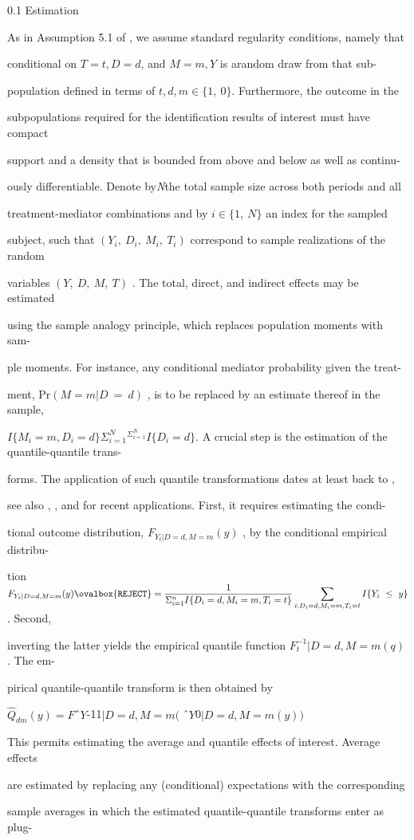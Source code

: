 \documentclass[a4paper,12pt]{article}
\begin{document}
0.1 Estimation

As in Assumption 5.1 of , we assume standard regularity conditions, namely that

conditional on $T = t, D = d$, and $M = m, Y$ is arandom draw from that sub-

population defined in terms of $t, d, m \in \{1,\ 0\}$. Furthermore, the outcome in the

subpopulations required for the identification results of interest must have compact

support and a density that is bounded from above and below as well as continu-

ously differentiable. Denote by{\it N}the total sample size across both periods and all

treatment-mediator combinations and by $i \in \{1,\ N\}$ an index for the sampled

subject, such that $(Y_{i},\ D_{i},\ M_{i},\ T_{i})$ correspond to sample realizations of the random

variables $(Y,\ D,\ M,\ T)$ . The total, direct, and indirect effects may be estimated

using the sample analogy principle, which replaces population moments with sam-

ple moments. For instance, any conditional mediator probability given the treat-

ment, $\mathrm{P}\mathrm{r} (M=m|D\ =\ d)$ , is to be replaced by an estimate thereof in the sample,

$I\{M_{i}=m,D_{i}=d\}\Sigma_{i=1}^{N}^{\Sigma_{i=1}^{N}}I\{D_{i}=d\}$. A crucial step is the estimation of the quantile-quantile trans-

forms. The application of such quantile transformations dates at least back to ,

see also , , and for recent applications. First, it requires estimating the condi-

tional outcome distribution, $F_{Y_{t}|D=d,M=m}(y)$ , by the conditional empirical distribu-

tion $F_{Y_{t}|D=d,M=m}(y)\ovalbox{\tt\small REJECT} = \displaystyle \frac{1}{\Sigma_{i=1}^{n}I\{D_{i}=d,M_{i}=m,T_{i}=t\}}\sum_{i:D_{i}=d,M_{i}=m,T_{i}=t}I\{Y_{i}\ \leq\ y\}$. Second,

inverting the latter yields the empirical quantile function $F_{t}^{-1}|D=d,M=m(q)$ . The em-

pirical quantile-quantile transform is then obtained by
\begin{center}
$\hat{Q}_{dm}(y) = F$ˆ$Y$-11$|D =d,M=m($ ˆ$Y$0$|D =d,M=m(y))$
\end{center}
This permits estimating the average and quantile effects of interest. Average effects

are estimated by replacing any (conditional) expectations with the corresponding

sample averages in which the estimated quantile-quantile transforms enter as plug-
\end{document}
